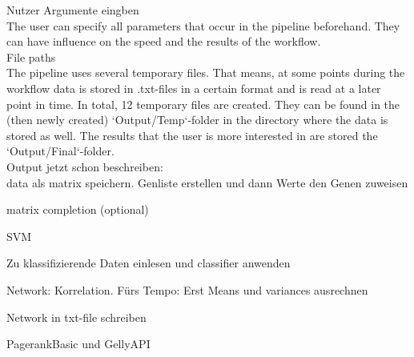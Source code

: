 \documentclass{bioinfo}
\begin{document}
 

    Nutzer Argumente eingben\\
    The user can specify all parameters that occur in the pipeline beforehand. They can have influence on the speed and the results of the workflow.\\

    File paths\\
    The pipeline uses several temporary files. That means, at some points during the workflow data is stored in .txt-files in a certain format and is read at a later point in time. In total, 12 temporary files are created. They can be found in the (then newly created) `Output/Temp`-folder in the directory where the data is stored as well. The results that the user is more interested in are stored the `Output/Final`-folder.\\
    
    
    Output jetzt schon beschreiben:\\
    
    
    data als matrix speichern. Genliste erstellen und dann Werte den Genen zuweisen 

    matrix completion (optional) 

    SVM 

    Zu klassifizierende Daten einlesen und classifier anwenden 

    Network: Korrelation. Fürs Tempo: Erst Means und variances ausrechnen 

    Network in txt-file schreiben 

    PagerankBasic und GellyAPI 

     
\end{document}
